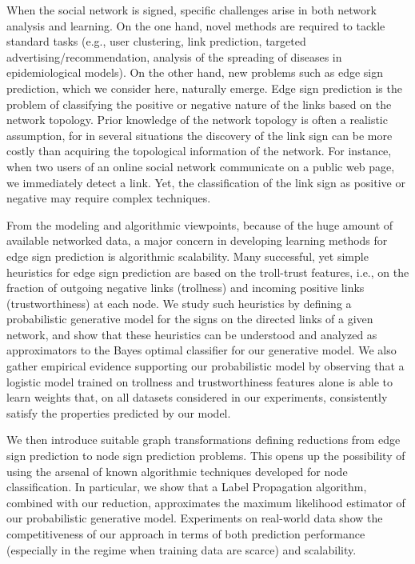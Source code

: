 When the social network is signed, specific challenges arise in both network analysis and learning. On the one hand, novel methods are required to tackle standard tasks (e.g., user clustering, link prediction, targeted advertising/recommendation, 
analysis of the spreading of diseases in epidemiological models). On the other hand, new problems such as edge sign prediction, which we consider here, naturally emerge. Edge sign prediction is the problem of classifying the positive or negative nature of the links based on the network topology. Prior knowledge of the network topology is often a realistic assumption, for in several situations the discovery of the link sign can be more costly than acquiring the topological information of the network. For instance, when two users of an online social network communicate on a public web page, we immediately detect a link. Yet, the classification of the link sign as positive or negative may require complex techniques. 

From the modeling and algorithmic viewpoints, because of the huge amount of available networked data, a major concern in developing learning methods for edge sign prediction is algorithmic scalability. Many successful, yet simple heuristics for edge sign prediction are based on the troll-trust features, i.e., on the fraction of outgoing negative links (trollness) and incoming positive links (trustworthiness) at each node. We study such heuristics by defining a probabilistic generative model for the signs on the directed links of a given network, and show that these heuristics can be understood and analyzed as approximators to the Bayes optimal classifier for our generative model. We also gather empirical evidence supporting our probabilistic model by observing that a logistic model trained on trollness and trustworthiness features alone is able to learn weights that, on all datasets considered in our experiments, consistently satisfy the properties predicted by our model.

We then introduce suitable graph transformations defining reductions from edge sign prediction to node sign prediction problems. This opens up the possibility of using the arsenal of known algorithmic techniques developed for node classification. In particular, we show that a Label Propagation algorithm, combined with our reduction, approximates the maximum likelihood estimator of our probabilistic generative model. Experiments on real-world data show the competitiveness of our approach in terms of both prediction performance (especially in the regime when training data are scarce) and scalability.

